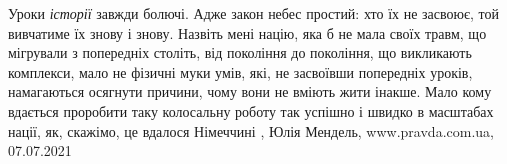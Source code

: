 Уроки \emph{історії} завжди болючі. Адже закон небес простий: хто їх не засвоює, той
вивчатиме їх знову і знову.  Назвіть мені націю, яка б не мала своїх травм, що
мігрували з попередніх століть, від покоління до покоління, що викликають
комплекси, мало не фізичні муки умів, які, не засвоївши попередніх уроків,
намагаються осягнути причини, чому вони не вміють жити інакше.  Мало кому
вдається проробити таку колосальну роботу так успішно і швидко в масштабах
нації, як, скажімо, це вдалося Німеччині
, 
Юлія Мендель, www.pravda.com.ua, 07.07.2021
